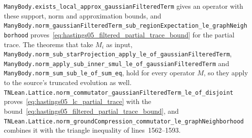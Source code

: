 \documentclass{article}
\providecommand{\leanid}[1]{\nolinkurl{#1}}
\begin{document}
\leanid{ManyBody.exists_local_approx_gaussianFilteredTerm} gives an
operator with these support, norm and approximation bounds, and
\leanid{ManyBody.norm_gaussianFilteredTerm_sub_regionExpectation_le_graphNeighborhood}
proves~\eqref{eq:hastings05_filtered_partial_trace_bound} for the partial
trace. The theorems that take $M_i$ as input,
\leanid{ManyBody.norm_sub_starProjection_apply_le_of_gaussianFilteredTerm},
\leanid{ManyBody.norm_apply_sub_inner_smul_le_of_gaussianFilteredTerm}
and \leanid{ManyBody.norm_sum_sub_le_of_sum_eq}, hold for every operator
$M$, so they apply to the source's truncated evolution as well.
\leanid{TNLean.Lattice.norm_commutator_gaussianFilteredTerm_le_of_disjoint}
proves~\eqref{eq:hastings05_lc_partial_trace} with the bound~\eqref{eq:hastings05_filtered_partial_trace_bound}, and
\leanid{TNLean.Lattice.norm_groundCompression_commutator_le_graphNeighborhood}
combines it with the triangle inequality of lines~1562--1593.



\end{document}

